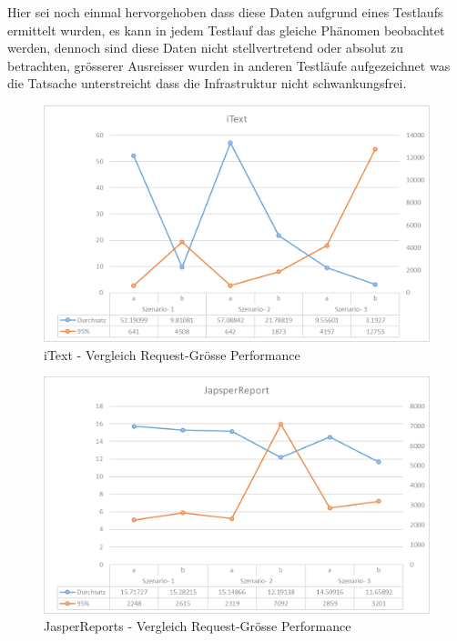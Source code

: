 \documentclass[main.tex]{subfiles}
\begin{document}
Hier sei noch einmal hervorgehoben dass diese Daten aufgrund eines Testlaufs ermittelt wurden, es kann in jedem Testlauf das gleiche Phänomen beobachtet werden, dennoch sind diese Daten nicht stellvertretend oder absolut zu betrachten, grösserer Ausreisser wurden in anderen Testläufe aufgezeichnet was die Tatsache unterstreicht dass die Infrastruktur nicht schwankungsfrei.


\begin{figure}[!ht]
\includegraphics[width=\textwidth/2]{mainpart/4_analyse_img/iText_ab.png}
 \caption{iText - Vergleich  Request-Grösse Performance}
 \label{figure:vglReqitext}
\end{figure}

\begin{figure}[ht]
\includegraphics[width=\textwidth/2]{mainpart/4_analyse_img/Jasper_ab.png}
 \caption{JasperReports - Vergleich Request-Grösse Performance }
 \label{figure:vglReqjasper}
\end{figure}
\end{document}
